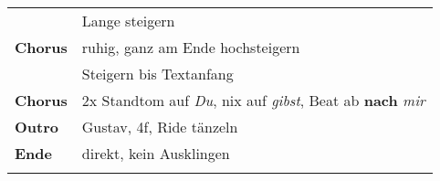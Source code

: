 \begin{tabular}{p{1.6cm}l}
	                & Lange steigern                                                                          \\
	\textbf{Chorus} & ruhig, ganz am Ende hochsteigern                                                        \\
	                & Steigern bis Textanfang                                                                 \\
	\textbf{Chorus} & 2x Standtom auf \textit{Du}, nix auf \textit{gibst}, Beat ab \textbf{nach} \textit{mir} \\
	\textbf{Outro}  & Gustav, 4f, Ride tänzeln                                                                \\
	\textbf{Ende}   & direkt, kein Ausklingen                                                                 \\
	                &                                                                                         \\
\end{tabular}

